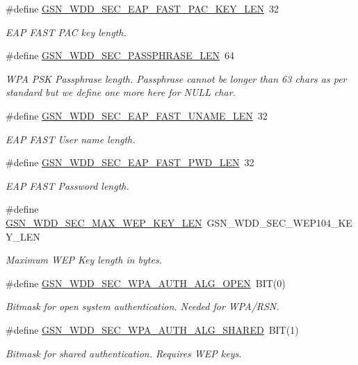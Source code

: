\begin{DoxyCompactItemize}
\#define \hyperlink{a00678_gabd73b0f9f75c95ccd502804aaf00897f}{GSN\_\-WDD\_\-SEC\_\-EAP\_\-FAST\_\-PAC\_\-KEY\_\-LEN}~32
\begin{DoxyCompactList}\small\item\em EAP FAST PAC key length. \end{DoxyCompactList}\item 
\#define \hyperlink{a00604_ad4bdfab3bec6e6e53d234319b63b904b}{GSN\_\-WDD\_\-SEC\_\-PASSPHRASE\_\-LEN}~64
\begin{DoxyCompactList}\small\item\em WPA PSK Passphrase length. Passphrase cannot be longer than 63 chars as per standard but we define one more here for NULL char. \end{DoxyCompactList}\item 
\#define \hyperlink{a00604_a321137b997df37274a82b1bfa7f766cb}{GSN\_\-WDD\_\-SEC\_\-EAP\_\-FAST\_\-UNAME\_\-LEN}~32
\begin{DoxyCompactList}\small\item\em EAP FAST User name length. \end{DoxyCompactList}\item 
\#define \hyperlink{a00604_a502f775f90fe2c3b3792bd7b203980ff}{GSN\_\-WDD\_\-SEC\_\-EAP\_\-FAST\_\-PWD\_\-LEN}~32
\begin{DoxyCompactList}\small\item\em EAP FAST Password length. \end{DoxyCompactList}\item 
\#define \hyperlink{a00604_a092fca8a7c994f74280b9a72d5eb45d0}{GSN\_\-WDD\_\-SEC\_\-MAX\_\-WEP\_\-KEY\_\-LEN}~GSN\_\-WDD\_\-SEC\_\-WEP104\_\-KEY\_\-LEN
\begin{DoxyCompactList}\small\item\em Maximum WEP Key length in bytes. \end{DoxyCompactList}\item 
\#define \hyperlink{a00604_ae8c55ea06d8f6eabb46d267a1b04137c}{GSN\_\-WDD\_\-SEC\_\-WPA\_\-AUTH\_\-ALG\_\-OPEN}~BIT(0)
\begin{DoxyCompactList}\small\item\em Bitmask for open system authentication. Needed for WPA/RSN. \end{DoxyCompactList}\item 
\#define \hyperlink{a00604_a699d18cd8487ece2da4aa073f60ab6af}{GSN\_\-WDD\_\-SEC\_\-WPA\_\-AUTH\_\-ALG\_\-SHARED}~BIT(1)
\begin{DoxyCompactList}\small\item\em Bitmask for shared authentication. Requires WEP keys. \end{DoxyCompactList}\item 

\end{DoxyCompactItemize}
